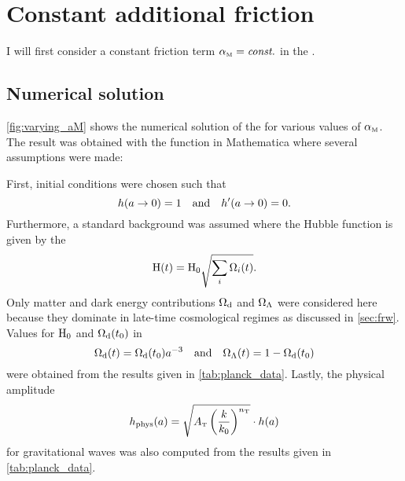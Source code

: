 \documentclass[12pt,parskip=half]{scrreprt}
\newcommand{\addref}{\todo[color=black!20]{ref.}}
\begin{document}
\section{Constant additional friction}\label{sec:param_friction_const}

I will first consider a constant friction term \({\alpha_{\textnormal{\tiny{M}}}}=\textnormal{\textit{const.}}\) in the .


\subsection{Numerical solution}

\autoref{fig:varying_aM} shows the numerical solution of the  for various values of \({\alpha_{\textnormal{\tiny{M}}}}\). The result was obtained with the  function in Mathematica where several assumptions were made:

First, initial conditions were chosen such that
\begin{equation}
	h(a \to 0) = 1 \quad \text{and} \quad h^\prime(a \to 0) = 0 \mathpunct{.}
\end{equation}
Furthermore, a standard \FLRW background was assumed where the Hubble function is given by the 
\begin{equation}
	\mathrm{H}(t) = \mathrm{H}_0 \sqrt{\sum_i\Omega_i(t)}
	\mathpunct{.}
\end{equation}
Only matter and dark energy contributions \(\Omega_{\mathrm{d}}\) and \(\Omega_\Lambda\) were considered here because they dominate in late-time cosmological regimes as discussed in \autoref{sec:frw}. Values for \(\mathrm{H}_0\) and \(\Omega_{\mathrm{d}}(t_0)\) in
\begin{equation}
	\Omega_{\mathrm{d}}(t) = \Omega_{\mathrm{d}}(t_0) a^{-3} \quad \text{and} \quad \Omega_\Lambda(t) = 1 - \Omega_{\mathrm{d}}(t_0)
\end{equation}
were obtained from the \cite{Planck}  results given in \autoref{tab:planck_data}.
Lastly, the physical amplitude
\begin{equation}
	h_\textnormal{phys}(a) = \sqrt{A_\tenspert\del{\frac{k}{k_0}}^{n_\tenspert}} \cdot h(a)
\end{equation}
for gravitational waves was also computed from the \cite{Planck} \addref results given in \autoref{tab:planck_data}. 
\end{document}
